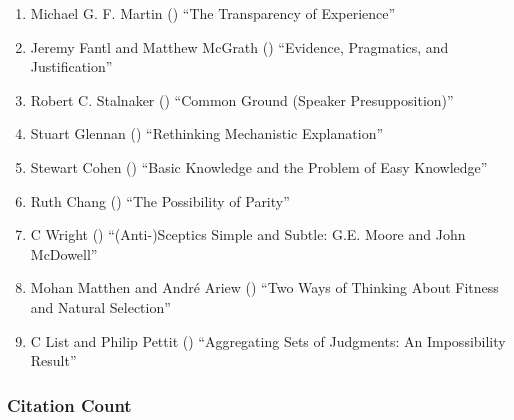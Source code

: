 \documentclass[
  10pt,
  letterpaper,
  DIV=11,
  numbers=noendperiod,
  twoside]{scrartcl}
\providecommand{\tightlist}{%
  \setlength{\itemsep}{0pt}\setlength{\parskip}{0pt}}\usepackage{longtable,booktabs,array}
\begin{document}
\begin{enumerate}
\def\labelenumi{\arabic{enumi}.}
\tightlist
\item
  Michael G. F. Martin () ``The
  Transparency of Experience''
\item
  Jeremy Fantl and Matthew McGrath
  () ``Evidence, Pragmatics, and
  Justification''
\item
  Robert C. Stalnaker () ``Common
  Ground (Speaker Presupposition)''
\item
  Stuart Glennan () ``Rethinking
  Mechanistic Explanation''
\item
  Stewart Cohen () ``Basic
  Knowledge and the Problem of Easy Knowledge''
\item
  Ruth Chang () ``The Possibility
  of Parity''
\item
  C Wright () ``(Anti-)Sceptics
  Simple and Subtle: G.E. Moore and John McDowell''
\item
  Mohan Matthen and André Ariew
  () ``Two Ways of Thinking About
  Fitness and Natural Selection''
\item
  C List and Philip Pettit ()
  ``Aggregating Sets of Judgments: An Impossibility Result''
\end{enumerate}

\subsubsection*{Citation Count}\label{sec-count-2002}
\end{document}
